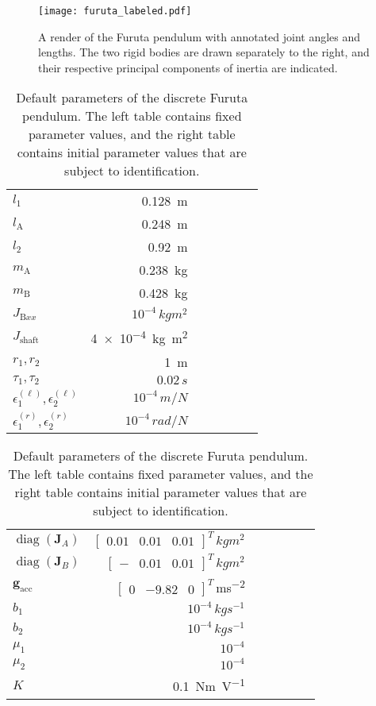 \documentclass[preprint,12pt]{elsarticle}
\let\vec\bm
\let\mat\mathbf
\DeclareMathOperator*{\diag}{diag}
\numberwithin{equation}{section}
\def\tA{\text{A}}
\def\tB{\text{B}}
\begin{document}
\begin{figure}
    \centering
    \texttt{[image: furuta\_labeled.pdf]}
    \caption{
        A render of the Furuta pendulum with annotated joint angles and lengths. 
        The two rigid bodies are drawn separately to the right, and their respective principal components of inertia are indicated.
    }
    \label{fig:furuta_labeled}
\end{figure}
\begin{table}
\caption{
    Default parameters of the discrete Furuta pendulum. 
    The left table contains fixed parameter values, and the right table contains initial parameter values that are subject to identification.
}
\label{tab:furuta_default_parameters}
\begin{tabular}{l|rrrrr|r}
    \midrule
    $l_1$ & \SI{0.128}{m} \\
    $l_\tA$ & \SI{0.248}{m} \\
    $l_2$ & \SI{0.92}{m} \\
    $m_\tA$ & \SI{0.238}{kg} \\
    $m_\tB$ & \SI{0.428}{kg} \\
    $J_{\tB xx}$ & $10^{-4}\,\si{kg m^2}$ \\
    $J_{\text{shaft}}$ & \SI{4e-4}{kg m^2} \\
    $r_1, r_2$ & \SI{1}{m} \\
    $\tau_1, \tau_2$ & $0.02\,\si{s}$ \\
    $\epsilon_1^{(\ell)}, \epsilon_2^{(\ell)}$ & $10^{-4}\,\si{m/N}$ \\
    $\epsilon_1^{(r)}, \epsilon_2^{(r)}$ & $10^{-4}\,\si{rad/N}$ \\
    \bottomrule
    \end{tabular}
    \qquad
    \begin{tabular}{l|rrrrr|r}
    \midrule
    $\diag{(\mat{J}_{A})}$ & $\begin{bmatrix}
        0.01 & 0.01 & 0.01
    \end{bmatrix}^T\,\si{kg m^2}$ \\
    $\diag{(\mat{J}_{B})}$ & $\begin{bmatrix}
        - & 0.01 & 0.01
    \end{bmatrix}^T\,\si{kg m^2}$ \\
    $\vec{g}_{\text{acc}}$ & $\begin{bmatrix}
        0 & -9.82 & 0
    \end{bmatrix}^T$\,\si{ms^{-2}} \\
    $b_{1}$ & $10^{-4}\,\si{kg s^{-1}}$ \\
    $b_{2}$ & $10^{-4}\,\si{kg s^{-1}}$ \\
    $\mu_{1}$ & $10^{-4}$ \\
    $\mu_{2}$ & $10^{-4}$ \\
    $K$ & \SI{0.1}{Nm V^{-1}} \\
    \bottomrule
    \end{tabular}
\end{table}
\end{document}

